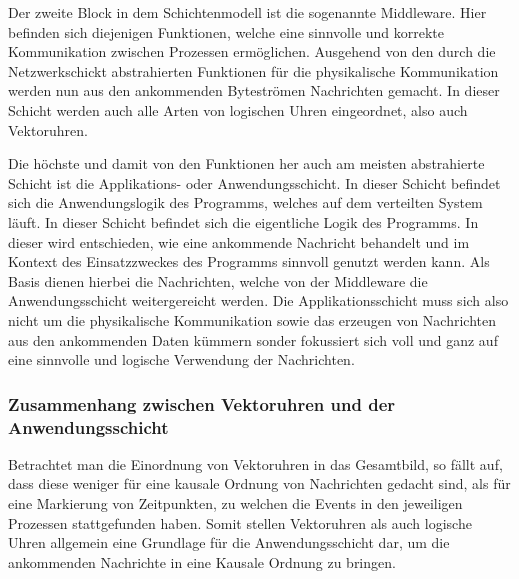  Der zweite Block in dem Schichtenmodell ist die sogenannte Middleware. Hier befinden sich diejenigen Funktionen, welche eine sinnvolle und korrekte Kommunikation zwischen Prozessen ermöglichen. Ausgehend von den durch die Netzwerkschickt abstrahierten Funktionen für die physikalische Kommunikation werden nun aus den ankommenden Byteströmen Nachrichten gemacht. In dieser Schicht werden auch alle Arten von logischen Uhren eingeordnet, also auch Vektoruhren.
 
 Die höchste und damit von den Funktionen her auch am meisten abstrahierte Schicht ist die Applikations- oder Anwendungsschicht. In dieser Schicht befindet sich die Anwendungslogik des Programms, welches auf dem verteilten System läuft. In dieser Schicht befindet sich die eigentliche Logik des Programms. In dieser wird entschieden, wie eine ankommende Nachricht behandelt und im Kontext des Einsatzzweckes des Programms sinnvoll genutzt werden kann. Als Basis dienen hierbei die Nachrichten, welche von der Middleware die Anwendungsschicht weitergereicht werden. Die Applikationsschicht muss sich also nicht um die physikalische Kommunikation sowie das erzeugen von Nachrichten aus den ankommenden Daten kümmern sonder fokussiert sich voll und ganz auf eine sinnvolle und logische Verwendung der Nachrichten.

\subsubsection{Zusammenhang zwischen Vektoruhren und der Anwendungsschicht}
Betrachtet man die Einordnung von Vektoruhren in das Gesamtbild, so fällt auf, dass diese weniger für eine kausale Ordnung von Nachrichten gedacht sind, als für eine Markierung von Zeitpunkten, zu welchen die Events in den jeweiligen Prozessen stattgefunden haben. Somit stellen Vektoruhren als auch logische Uhren allgemein eine Grundlage für die Anwendungsschicht dar, um die ankommenden Nachrichte in eine Kausale Ordnung zu bringen. 